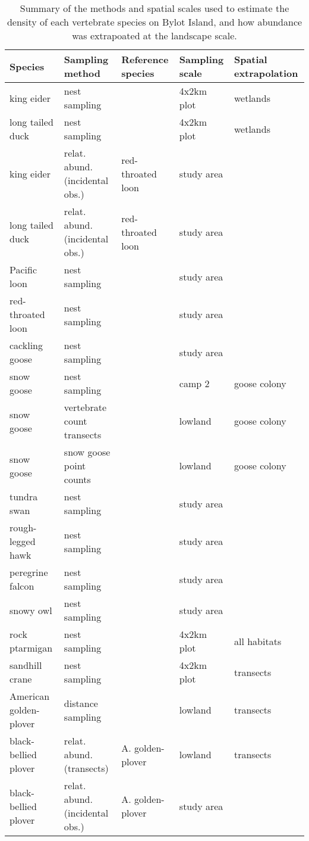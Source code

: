 \begin{table}[H]
\centering
\caption{Summary of the methods and spatial scales used to estimate the density of each vertebrate species on Bylot Island, and how abundance was extrapoated at the landscape scale.} 
\label{table:summary_methods}
\begingroup\fontsize{8pt}{10pt}\selectfont
\begin{tabularx}{\textwidth}{lllll}
  \hline
Species & Sampling method & Reference species & Sampling scale & Spatial extrapolation \\ 
  \hline
king eider & nest sampling &  & 4x2km plot & wetlands \\ 
  long tailed duck & nest sampling &  & 4x2km plot & wetlands \\ 
  king eider & relat. abund. (incidental obs.) & red-throated loon & study area &  \\ 
  long tailed duck & relat. abund. (incidental obs.) & red-throated loon & study area &  \\ 
  Pacific loon & nest sampling &  & study area &  \\ 
  red-throated loon & nest sampling &  & study area &  \\ 
  cackling goose & nest sampling &  & study area &  \\ 
  snow goose & nest sampling &  & camp 2 & goose colony \\ 
  snow goose & vertebrate count transects &  & lowland & goose colony \\ 
  snow goose & snow goose point counts &  & lowland & goose colony \\ 
  tundra swan & nest sampling &  & study area &  \\ 
  rough-legged hawk & nest sampling &  & study area &  \\ 
  peregrine falcon & nest sampling &  & study area &  \\ 
  snowy owl & nest sampling &  & study area &  \\ 
  rock ptarmigan & nest sampling &  & 4x2km plot & all habitats \\ 
  sandhill crane & nest sampling &  & 4x2km plot & transects \\ 
  American golden-plover & distance sampling &  & lowland & transects \\ 
  black-bellied plover & relat. abund. (transects) & A. golden-plover & lowland & transects \\ 
  black-bellied plover & relat. abund. (incidental obs.) & A. golden-plover & study area &  \\ 

\end{tabularx}
\end{table}

